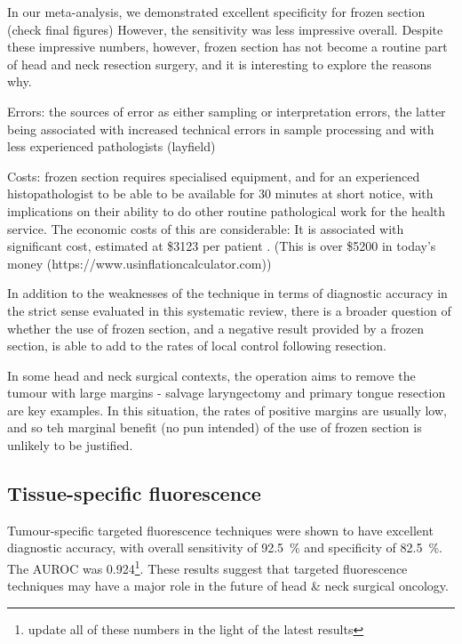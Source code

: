 In our meta-analysis, we demonstrated excellent specificity for frozen section (check final figures)
However, the sensitivity was less impressive overall.
Despite these impressive numbers, however, frozen section has not become a routine part of head and neck resection surgery, and it is interesting to explore the reasons why.

Errors: the sources of error as either sampling or interpretation errors, the latter being associated with increased technical errors in sample processing and with less experienced pathologists (layfield)

Costs: frozen section requires specialised equipment, and for an experienced histopathologist to be able to be available for 30 minutes at short notice, with implications on their ability to do other routine pathological work for the health service. 
The economic costs of this are considerable: 
It is associated with significant cost, estimated at \$3123 per patient \cite{dinardoAccuracyUtilityCost2000}. 
(This is over \$5200 in today's money (https://www.usinflationcalculator.com))

In addition to the weaknesses of the technique in terms of diagnostic accuracy in the strict sense evaluated in this systematic review, there is a broader question of whether the use of frozen section, and a negative result provided by a frozen section, is able to add to the rates of local control following resection.

In some head and neck surgical contexts, the operation aims to remove the tumour with large margins - salvage laryngectomy and primary tongue resection are key examples. 
In this situation, the rates of positive margins are usually low, and so teh marginal benefit (no pun intended) of the use of frozen section is unlikely to be justified.





\subsection{Tissue-specific fluorescence}

Tumour-specific targeted fluorescence techniques were shown to have excellent diagnostic accuracy, with overall sensitivity of \SI{92.5}{\percent} and specificity of \SI{82.5}{\percent}. 
The AUROC was 0.924\footnote{update all of these numbers in the light of the latest results}. 
These results suggest that targeted fluorescence techniques may have a major role in the future of head \& neck surgical oncology.

